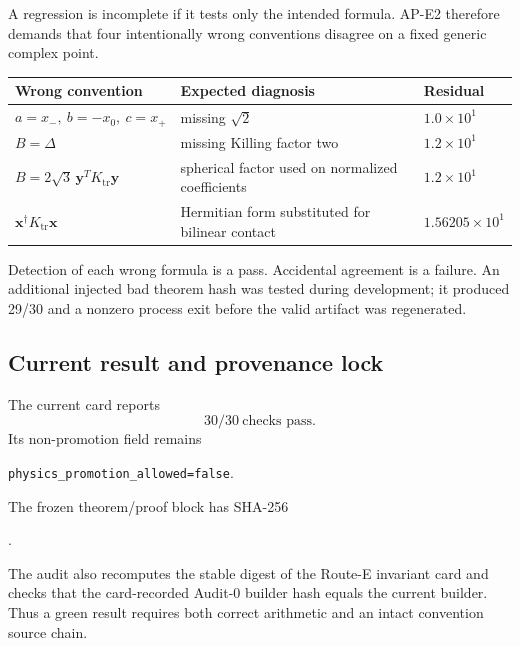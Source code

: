 \documentclass[11pt]{article}
\numberwithin{equation}{section}
\newcommand{\Ktr}{K_{\mathrm{tr}}}
\newcommand{\nopromote}{\texttt{physics\_promotion\_allowed=false}}
\begin{document}
A regression is incomplete if it tests only the intended formula.  AP-E2
therefore demands that four intentionally wrong conventions disagree on a
fixed generic complex point.
\begin{center}
\begin{tabularx}{\textwidth}{@{}>{\raggedright\arraybackslash}X
                                 >{\raggedright\arraybackslash}p{}
                                 >{\raggedleft\arraybackslash}p{}@{}}
\toprule
Wrong convention & Expected diagnosis & Residual\\
\midrule
\(a=x_-,\ b=-x_0,\ c=x_+\) & missing \(\sqrt2\) & \(1.0\times10^1\)\\
\(B=\Delta\) & missing Killing factor two & \(1.2\times10^1\)\\
\(B=2\sqrt3\,\bm y^T\Ktr\bm y\) & spherical factor used on normalized
coefficients & \(1.2\times10^1\)\\
\(\bm x^\dagger\Ktr\bm x\) & Hermitian form substituted for bilinear contact
& \(1.56205\times10^1\)\\
\bottomrule
\end{tabularx}
\end{center}
Detection of each wrong formula is a pass.  Accidental agreement is a failure.
An additional injected bad theorem hash was tested during development; it
produced 29/30 and a nonzero process exit before the valid artifact was
regenerated.

\subsection{Current result and provenance lock}

The current card reports
\begin{equation}
 \boxed{30/30\ \text{checks pass}.}
 \label{eq:thirty-pass}
\end{equation}
Its non-promotion field remains
\begin{center}
\nopromote.
\end{center}
The frozen theorem/proof block has SHA-256
\begin{center}
.
\end{center}
The audit also recomputes the stable digest of the Route-E invariant card and
checks that the card-recorded Audit-0 builder hash equals the current builder.
Thus a green result requires both correct arithmetic and an intact convention
source chain.
\end{document}
